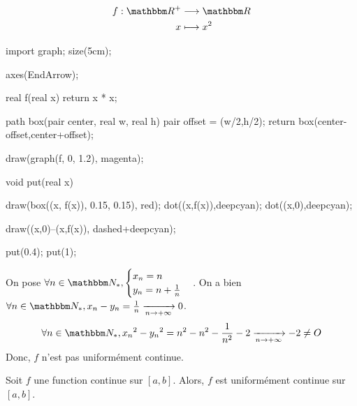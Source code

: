 \begin{exm}
	\begin{align*}
		f: \R^+ &\longrightarrow \R \\
		x &\longmapsto x^2
	\end{align*}

	\begin{center}
		\begin{asy}
			import graph; size(5cm);

			axes(EndArrow);

			real f(real x) { return x * x; }

			path box(pair center, real w, real h) {
				pair offset = (w/2,h/2);
				return box(center-offset,center+offset);
			}

			draw(graph(f, 0, 1.2), magenta);

			void put(real x) {
				draw(box((x, f(x)), 0.15, 0.15), red);
				dot((x,f(x)),deepcyan);
				dot((x,0),deepcyan);

				draw((x,0)--(x,f(x)), dashed+deepcyan);
			}

			put(0.4);
			put(1);
		\end{asy}
	\end{center}

	On pose $\forall n \in \N_*, \begin{cases}
		x_n = n\\
		y_n = n + \frac{1}{n}
	\end{cases}$. On a bien $\forall n \in \N_*, x_n - y_n = \frac{1}{n} \tendsto{n \to +\infty} 0$. \\
	\[
		\forall n \in \N_*, {x_n}^2 - {y_n}^2 = \cancel{n^2} - \cancel{n^2} - \frac{1}{n^2} - 2\tendsto{n\to +\infty} -2 \neq O
	\]
	Donc, $f$ n'est pas uniformément continue.
\end{exm}

\begin{thm}

	Soit $f$ une function continue sur $[a,b]$. Alors, $f$ est uniformément continue sur $[a,b]$.
\end{thm}

